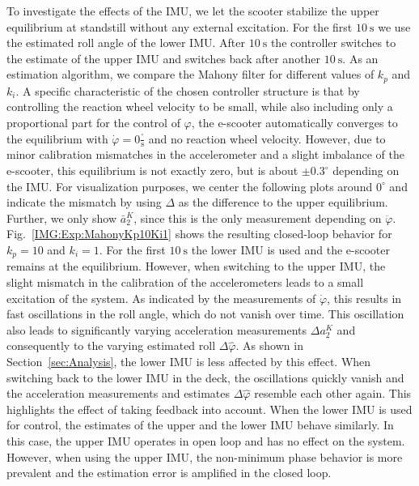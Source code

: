To investigate the effects of the \ac{IMU}, we let the scooter stabilize the upper equilibrium at standstill without any external excitation.
For the first $\SI{10}{\second}$ we use the estimated roll angle of the lower \ac{IMU}.
After $\SI{10}{\second}$ the controller switches to the estimate of the upper \ac{IMU} and switches back after another $\SI{10}{\second}$.
As an estimation algorithm, we compare the Mahony filter for different values of $k_p$ and $k_i$.
A specific characteristic of the chosen controller structure is that by controlling the reaction wheel velocity to be small, while also including only a proportional part for the control of $\varphi$, the \ac{e-scooter} automatically converges to the equilibrium with $\dot{\varphi}=0\tfrac{^\circ}{\si{\s}}$ and no reaction wheel velocity. 
However, due to minor calibration mismatches in the accelerometer and a slight imbalance of the \ac{e-scooter}, this equilibrium is not exactly zero, but is about $\pm 0.3^\circ$ depending on the \ac{IMU}.
For visualization purposes, we center the following plots around $0^\circ$ and indicate the mismatch by using $\Delta$ as the difference to the upper equilibrium.
Further, we only show $\bar{a}_2^K$, since this is the only measurement depending on $\ddot{\varphi}$.
Fig.~\ref{IMG:Exp:MahonyKp10Ki1} shows the resulting closed-loop behavior for $k_p = 10$ and $k_i = 1$.
For the first $\SI{10}{\second}$ the lower \ac{IMU} is used and the \ac{e-scooter} remains at the equilibrium.
However, when switching to the upper \ac{IMU}, the slight mismatch in the calibration of the accelerometers leads to a small excitation of the system.
As indicated by the measurements of $\dot{\varphi}$, this results in fast oscillations in the roll angle, which do not vanish over time.
This oscillation also leads to significantly varying acceleration measurements $\Delta a^K_2$ and consequently to the varying estimated roll $\Delta \hat{\varphi}$.
As shown in Section~\ref{sec:Analysis}, the lower \ac{IMU} is less affected by this effect.
When switching back to the lower \ac{IMU} in the deck, the oscillations quickly vanish and the acceleration measurements and estimates $\Delta \hat{\varphi}$ resemble each other again.
This highlights the effect of taking feedback into account.
When the lower \ac{IMU} is used for control, the estimates of the upper and the lower \ac{IMU} behave similarly.
In this case, the upper \ac{IMU} operates in open loop and has no effect on the system. 
However, when using the upper \ac{IMU}, the non-minimum phase behavior is more prevalent and the estimation error is amplified in the closed loop.

